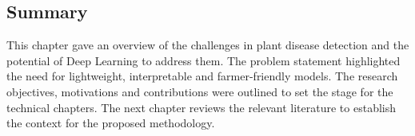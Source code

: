 \subsection*{Summary}
This chapter gave an overview of the challenges in plant disease detection and the potential of Deep Learning to address them. The problem statement highlighted the need for lightweight, interpretable and farmer-friendly models. The research objectives, motivations and contributions were outlined to set the stage for the technical chapters. The next chapter reviews the relevant literature to establish the context for the proposed methodology.
